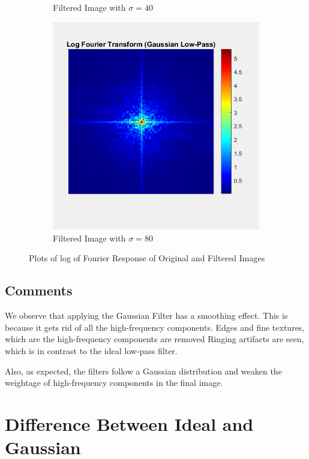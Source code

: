 \documentclass[a4paper]{article}
\begin{document}
\begin{figure}[h]
\begin{subfigure}{0.32\linewidth}
        \caption{Filtered Image with $ \sigma=40$}
    \end{subfigure}
    \begin{subfigure}{0.32\linewidth}
        \centering
        \includegraphics[width=\linewidth]{80_image_fo.png}
        \caption{Filtered Image with $ \sigma=80$}
    \end{subfigure}
    \caption{Plots of log of Fourier Response of Original and Filtered Images}
    \label{fig:bo}
\end{figure}

\subsection{Comments}
We observe that applying the Gaussian Filter has a smoothing effect. This is because it gets rid of all the high-frequency components. Edges and fine textures, which are the high-frequency components are removed Ringing artifacts are seen, which is in contrast to the ideal low-pass filter.

Also, as expected, the filters follow a Gaussian distribution and weaken the weightage of high-frequency components in the final image.

\section{Difference Between Ideal and Gaussian}
\end{document}
